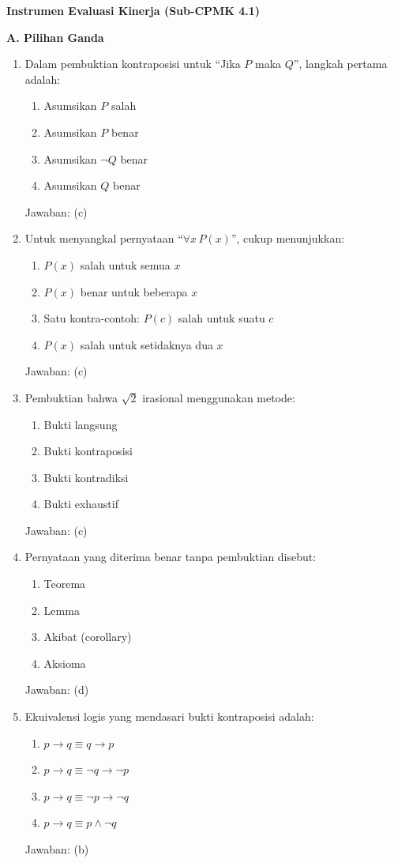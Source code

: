 \documentclass[../main]{subfiles}
\begin{document}
\begin{asesmen}
\textbf{Instrumen Evaluasi Kinerja (Sub-CPMK 4.1)}

\textbf{A. Pilihan Ganda}
\begin{enumerate}
  \item Dalam pembuktian kontraposisi untuk ``Jika $P$ maka $Q$'', langkah pertama adalah:
  \begin{enumerate}
    \item Asumsikan $P$ salah
    \item Asumsikan $P$ benar
    \item Asumsikan $\neg Q$ benar
    \item Asumsikan $Q$ benar
  \end{enumerate}
  Jawaban: (c)

  \item Untuk menyangkal pernyataan ``$\forall x\, P(x)$'', cukup menunjukkan:
  \begin{enumerate}
    \item $P(x)$ salah untuk semua $x$
    \item $P(x)$ benar untuk beberapa $x$
    \item Satu kontra-contoh: $P(c)$ salah untuk suatu $c$
    \item $P(x)$ salah untuk setidaknya dua $x$
  \end{enumerate}
  Jawaban: (c)

  \item Pembuktian bahwa $\sqrt{2}$ irasional menggunakan metode:
  \begin{enumerate}
    \item Bukti langsung
    \item Bukti kontraposisi
    \item Bukti kontradiksi
    \item Bukti exhaustif
  \end{enumerate}
  Jawaban: (c)

  \item Pernyataan yang diterima benar tanpa pembuktian disebut:
  \begin{enumerate}
    \item Teorema
    \item Lemma
    \item Akibat (corollary)
    \item Aksioma
  \end{enumerate}
  Jawaban: (d)

  \item Ekuivalensi logis yang mendasari bukti kontraposisi adalah:
  \begin{enumerate}
    \item $p \rightarrow q \equiv q \rightarrow p$
    \item $p \rightarrow q \equiv \neg q \rightarrow \neg p$
    \item $p \rightarrow q \equiv \neg p \rightarrow \neg q$
    \item $p \rightarrow q \equiv p \wedge \neg q$
  \end{enumerate}
  Jawaban: (b)
\end{enumerate}


\end{asesmen}
\end{document}
